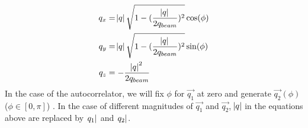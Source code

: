 \documentclass[20pt]{article}
\begin{document}
\begin{align}
q_x &= \abs{q}\sqrt{1-(\frac{\abs{q}}{2q_{beam}})^2} \cos(\phi) \\
q_y &= \abs{q}\sqrt{1-(\frac{\abs{q}}{2q_{beam}})^2} \sin(\phi) \\
q_z &= -\frac{\abs{q}^2}{2q_{beam}} 
\end{align}
In the case of the autocorrelator, we will fix $\phi$ for $\vec{q_1}$ at zero and generate $\vec{q_2}(\phi)$ ($\phi \in [0 , \pi]$) . In the case of different magnitudes of $\vec{q_1}$ and $\vec{q_2}$, $\abs{q}$ in the equations above are replaced by $\abs{q_1}$ and $\abs{q_2}$.
\end{document}
